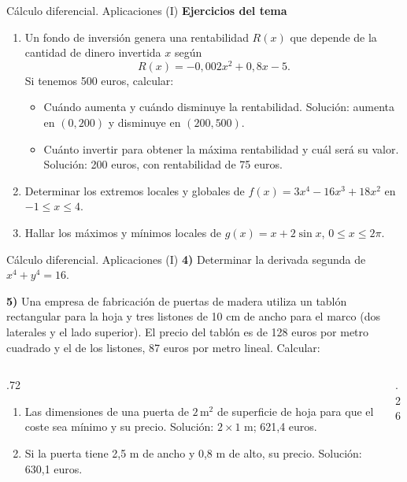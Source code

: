 \documentclass[main.tex]{subfiles}
\begin{document}
\begin{frame}{Cálculo diferencial. Aplicaciones (I)}
\footnotesize\textbf{Ejercicios del tema}
\begin{enumerate}
\item Un fondo de inversión genera una rentabilidad $R(x)$ que depende de la cantidad de dinero invertida $x$ según
\[R(x)=-0{,}002x^2+0{,}8x-5.\]
Si tenemos 500 euros, calcular:
\begin{itemize}
\item Cuándo aumenta y cuándo disminuye la rentabilidad. Solución: aumenta en $(0,200)$ y disminuye en $(200,500)$.
\item Cuánto invertir para obtener la máxima rentabilidad y cuál será su valor. Solución: 200 euros, con rentabilidad de 75 euros.
\end{itemize}
\item Determinar los extremos locales y globales de $f(x)=3x^4-16x^3+18x^2$ en $-1\le x\le4$.
\item Hallar los máximos y mínimos locales de $g(x)=x+2\sin x$, $0\le x\le2\pi$.
\end{enumerate}
\end{frame}
\begin{frame}{Cálculo diferencial. Aplicaciones (I)}
\footnotesize
\textbf{4)} Determinar la derivada segunda de $x^4+y^4=16$.
\medskip

\textbf{5)} Una empresa de fabricación de puertas de madera utiliza un tablón rectangular para la hoja y tres listones de 10 cm de ancho para el marco (dos laterales y el lado superior). El precio del tablón es de 128 euros por metro cuadrado y el de los listones, 87 euros por metro lineal. Calcular:
\begin{columns}[c]
\begin{column}{.72\textwidth}
\begin{enumerate}
\item Las dimensiones de una puerta de $2\,\mathrm{m}^2$ de superficie de hoja para que el coste sea mínimo y su precio. Solución: $2\times1$ m; 621,4 euros.
\item Si la puerta tiene 2,5 m de ancho y 0,8 m de alto, su precio. Solución: 630,1 euros.
\end{enumerate}
\end{column}
\begin{column}{.26\textwidth}\end{column}
\end{columns}
\end{frame}
\end{document}
